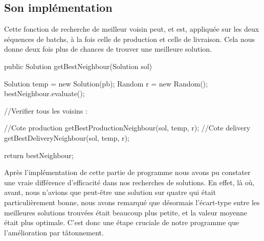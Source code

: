 \vspace{1em}

\subsection{Son implémentation}
Cette fonction de recherche de meilleur voisin peut, et est, appliquée sur les deux séquences de batchs, à la fois celle de production et celle de livraison. Cela nous donne deux fois plus de chances de trouver une meilleure solution.

\begin{java}
public Solution getBestNeighbour(Solution sol) {
	Solution temp = new Solution(pb);
	Random r = new Random();
	bestNeighbour.evaluate();
	
	//Verifier tous les voisins :
	
	//Cote production
	getBestProductionNeighbour(sol, temp, r);
	//Cote delivery
	getBestDeliveryNeighbour(sol, temp, r);
	
	return bestNeighbour;
}
\end{java}

\vspace{1em}

Après l'implémentation de cette partie de programme nous avons pu constater une vraie différence d'efficacité dans nos recherches de solutions. En effet, là où, avant, nous n'avions que peut-être une solution sur quatre qui était particulièrement bonne, nous avons remarqué que désormais l'écart-type entre les meilleures solutions trouvées était beaucoup plus petite, et la valeur moyenne était plus optimale. C'est donc une étape cruciale de notre programme que l'amélioration par tâtonnement.
